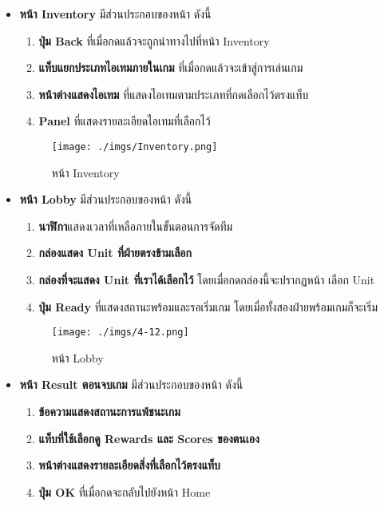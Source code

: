\documentclass[12pt,oneside,openright,a4paper]{cpe-thai-project}
\begin{document}
\begin{enumerate}
\begin{itemize}
      \pagebreak
      \item \textbf{หน้า Inventory} มีส่วนประกอบของหน้า ดังนี้ 
      \begin{enumerate}
        \item \textbf{ปุ่ม Back} ที่เมื่อกดแล้วจะถูกนำทางไปที่หน้า Inventory 
        \item \textbf{แท็บแยกประเภทไอเทมภายในเกม} ที่เมื่อกดแล้วจะเข้าสู่การเล่นเกม
        \item \textbf{หน้าต่างแสดงไอเทม} ที่แสดงไอเทมตามประเภทที่กดเลือกไว้ตรงแท็บ
        \item \textbf{Panel} ที่แสดงรายละเอียดไอเทมที่เลือกไว้
      \end{enumerate}
      
      \begin{figure}[H]\centering
        \texttt{[image: ./imgs/Inventory.png]}
        \caption{หน้า Inventory}\label{fig:4-11}
      \end{figure}

      \item \textbf{หน้า Lobby} มีส่วนประกอบของหน้า ดังนี้ 
      \begin{enumerate}
        \item \textbf{นาฬิกา}แสดงเวลาที่เหลือภายในขั้นตอนการจัดทีม
        \item \textbf{กล่องแสดง Unit ที่ฝ่ายตรงข้ามเลือก} 
        \item \textbf{กล่องที่จะแสดง Unit ที่เราได้เลือกไว้} โดยเมื่อกดกล่องนี้จะปรากฏหน้า เลือก Unit 
        \item \textbf{ปุ่ม Ready} ที่แสดงสถานะพร้อมและรอเริ่มเกม โดยเมื่อทั้งสองฝ่ายพร้อมเกมก็จะเริ่ม
      \end{enumerate}
      
      \begin{figure}[H]\centering
        \texttt{[image: ./imgs/4-12.png]}
        \caption{หน้า Lobby}\label{fig:4-12}
      \end{figure}
     
      \pagebreak
      \item \textbf{หน้า Result ตอนจบเกม} มีส่วนประกอบของหน้า ดังนี้ 
      \begin{enumerate}
        \item \textbf{ข้อความแสดงสถานะการแพ้ชนะเกม}
        \item \textbf{แท็บที่ใช้เลือกดู Rewards และ Scores ของตนเอง} 
        \item \textbf{หน้าต่างแสดงรายละเอียดสิ่งที่เลือกไว้ตรงแท็บ} 
        \item \textbf{ปุ่ม OK} ที่เมื่อกดจะกลับไปยังหน้า Home 
      \end{enumerate}


\end{itemize}
\end{enumerate}
\end{document}
